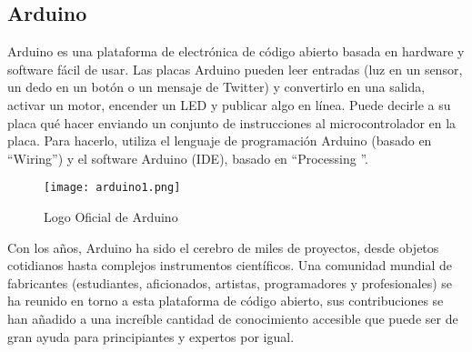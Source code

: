 \subsection{Arduino}

\par
Arduino es una plataforma de electrónica de código abierto basada en hardware y software fácil de usar. Las placas Arduino pueden leer entradas (luz en un sensor, un dedo en un botón o un mensaje de Twitter) y convertirlo en una salida, activar un motor, encender un LED y publicar algo en línea. Puede decirle a su placa qué hacer enviando un conjunto de instrucciones al microcontrolador en la placa. Para hacerlo, utiliza el lenguaje de programación Arduino (basado en \textquotedblleft Wiring\textquotedblright) y el software Arduino (IDE), basado en \textquotedblleft Processing \textquotedblright\cite{arduino-intro}.

\begin{figure}[H]
	\centering
	\texttt{[image: arduino1.png]}
	\caption{Logo Oficial de Arduino}
\end{figure}

\par \noindent
Con los años, Arduino ha sido el cerebro de miles de proyectos, desde objetos cotidianos hasta complejos instrumentos científicos. Una comunidad mundial de fabricantes (estudiantes, aficionados, artistas, programadores y profesionales) se ha reunido en torno a esta plataforma de código abierto, sus contribuciones se han añadido a una increíble cantidad de conocimiento accesible que puede ser de gran ayuda para principiantes y expertos por igual\cite{arduino-intro}.